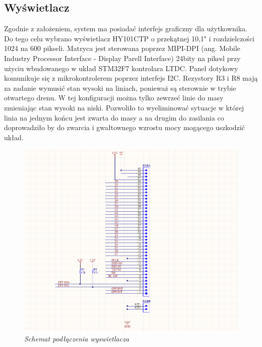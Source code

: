 \documentclass[eng,printmode]{mgr}
\begin{document}
\subsection{Wyświetlacz}
Zgodnie z założeniem, system ma posiadać interfejs graficzny dla użytkownika. Do tego celu wybrano wyświetlacz HY101CTP o przekątnej 10,1" i rozdzielczości 1024 na 600 pikseli. Matryca jest sterowana poprzez MIPI-DPI (ang. Mobile Industry Processor Interface - Display Parell Interface) 24bity na pikesl przy użyciu wbudowanego w układ STM32F7 kontrolara LTDC. Panel dotykowy komunikuje się z mikrokontrolerem poprzez interfejs I2C. Rezystory R3 i R8 mają za zadanie wymusić stan wysoki na liniach, ponieważ są sterownie w trybie otwartego drenu. W tej konfiguracji można tylko zewrzeć linie do masy zmieniając stan wysoki na niski. Pozwoliło to wyeliminować sytuacje w której linia na jednym końcu jest zwarta do masy a na drugim do zasilania co doprowadziło by do zwarcia i gwałtownego wzrostu mocy mogącego uszkodzić układ.
\begin{figure}[!h]
    \centering
    \includegraphics[width=\textwidth]{schematics/display.png}
    \caption{\textit{\scriptsize Schemat podłączenia wyswietlacza}}
\end{figure}
\end{document}

